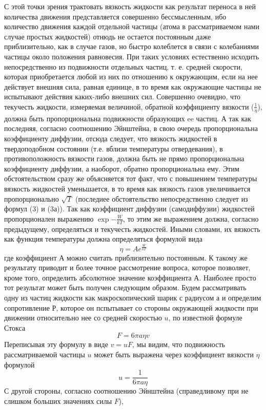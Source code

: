 \documentclass[a4paper, 12pt]{article}
\begin{document}
С этой точки зрения трактовать вязкость жидкости как результат переноса в ней количества движения представляется совершенно 
бессмысленным, ибо количество движения каждой отдельной частицы (атома в рассматриваемом нами случае простых жидкостей) 
отнюдь не остается постоянным даже приблизительно, как в случае газов, но быстро колеблется в связи с колебаниями частицы 
около положения равновесия. При таких условиях естественно исходить непосредственно из подвижности отдельных частиц, 
т. е. средней скорости, которая приобретается любой из них по отношению к окружающим, если на нее действует внешняя сила, 
равная единице, в то время как окружающие частицы не испытывают действия каких-либо внешних сил. Совершенно очевидно, что
текучесть жидкости, измеряемая величиной, обратной коэффициенту вязкости ($\frac{1}{\eta}$), должна быть пропорциональна 
подвижности образующих ee частиц. А так как последняя, согласно соотношению Эйнштейна, в свою очередь пропорциональна 
коэффициенту диффузии, отсюда следует, что вязкость жидкостей в твердоподобном состоянии 
(т.е. вблизи температуры отвердевания), в противоположность вязкости газов, должна быть не прямо пропорциональна 
коэффициенту диффузии, а наоборот, обратно пропорциональна ему.
Этим обстоятельством сразу же объясняется тот факт, что с повышением температуры вязкость жидкостей уменьшается, 
в то время как вязкость газов увеличивается пропорционально $\sqrt{T}$ (последиее обстоятельство непосредственно следует
 из формул (3) и (3а)). Так как коэффициент диффузии (самодиффузии) жидкостей пропорционален выражению $\exp{-\frac{W}{kT}}$,
то этим же выражением должна, согласно предыдущему, определяться и текучесть жидкостей. 
Иными словами, их вязкость как функция температуры должна определяться формулой вида
\[\eta = Ae^{\frac{W}{kT}}\]
где коэффициент $А$ можно считать приблизительно постоянным.
К такому же результату приводит и более точное рассмотрение вопроса, которое позволяет, кроме того, определить абсолютное 
значение коэффициента А.
Наиболее просто тот результат может быть получен следующим образом. Будем рассматривать одну из частиц жидкости как 
макроскопический шарик с радиусом а и определим сопротивление Р, которое он пспытывает со стороны окружающей жидкости
при движении относительно нее со средней скоростью $u$, по известной формуле Стокса
\[F = 6\pi a \eta v\]
Переписывая эту формулу в виде $v = uF$, мы видим, что подвижность рассматриваемой
частицы $u$ может быть выражена через коэффициент вязкости $\eta$ формулой
\[u = \frac{1}{6\pi a \eta}\]
С другой стороны, согласно соотношению Эйнштейна (справедливому при не слишком больших значениях силы $F$),
\end{document}
